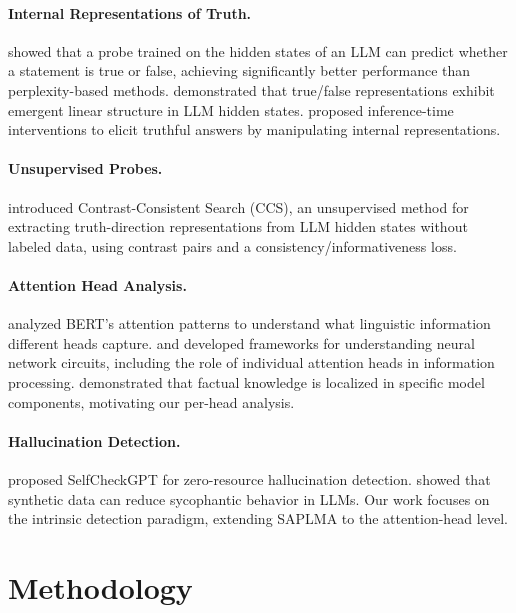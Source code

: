 \documentclass[11pt]{article}
\begin{document}
\paragraph{Internal Representations of Truth.} \citet{azaria2023internal} showed that a probe trained on the hidden states of an LLM can predict whether a statement is true or false, achieving significantly better performance than perplexity-based methods. \citet{marks2023geometry} demonstrated that true/false representations exhibit emergent linear structure in LLM hidden states. \citet{li2023inference} proposed inference-time interventions to elicit truthful answers by manipulating internal representations.

\paragraph{Unsupervised Probes.} \citet{burns2022discovering} introduced Contrast-Consistent Search (CCS), an unsupervised method for extracting truth-direction representations from LLM hidden states without labeled data, using contrast pairs and a consistency/informativeness loss.

\paragraph{Attention Head Analysis.} \citet{clark2019bert} analyzed BERT's attention patterns to understand what linguistic information different heads capture. \citet{elhage2022toy} and \citet{olah2020zoom} developed frameworks for understanding neural network circuits, including the role of individual attention heads in information processing. \citet{meng2022locating} demonstrated that factual knowledge is localized in specific model components, motivating our per-head analysis.

\paragraph{Hallucination Detection.} \citet{manakul2023selfcheckgpt} proposed SelfCheckGPT for zero-resource hallucination detection. \citet{wei2024simple} showed that synthetic data can reduce sycophantic behavior in LLMs. Our work focuses on the intrinsic detection paradigm, extending SAPLMA to the attention-head level.

\section{Methodology}
\label{sec:methodology}
\end{document}
